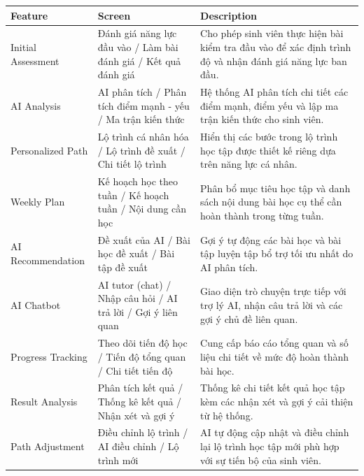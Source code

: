 \documentclass[12pt,a4paper]{article}
\begin{document}
	\begin{longtable}{|p{3.2cm}|p{5.5cm}|p{7.3cm}|}
		\hline
		\rowcolor{tableheader}
		\textbf{Feature} & \textbf{Screen} & \textbf{Description} \\ \hline
		\endhead
		
		Initial Assessment & Đánh giá năng lực đầu vào / Làm bài đánh giá / Kết quả đánh giá & Cho phép sinh viên thực hiện bài kiểm tra đầu vào để xác định trình độ và nhận đánh giá năng lực ban đầu. \\ \hline
		
		AI Analysis & AI phân tích / Phân tích điểm mạnh - yếu / Ma trận kiến thức & Hệ thống AI phân tích chi tiết các điểm mạnh, điểm yếu và lập ma trận kiến thức cho sinh viên. \\ \hline
		
		Personalized Path & Lộ trình cá nhân hóa / Lộ trình đề xuất / Chi tiết lộ trình & Hiển thị các bước trong lộ trình học tập được thiết kế riêng dựa trên năng lực cá nhân. \\ \hline
		
		Weekly Plan & Kế hoạch học theo tuần / Kế hoạch tuần / Nội dung cần học & Phân bổ mục tiêu học tập và danh sách nội dung bài học cụ thể cần hoàn thành trong từng tuần. \\ \hline
		
		AI Recommendation & Đề xuất của AI / Bài học đề xuất / Bài tập đề xuất & Gợi ý tự động các bài học và bài tập luyện tập bổ trợ tối ưu nhất do AI phân tích. \\ \hline
		
		AI Chatbot & AI tutor (chat) / Nhập câu hỏi / AI trả lời / Gợi ý liên quan & Giao diện trò chuyện trực tiếp với trợ lý AI, nhận câu trả lời và các gợi ý chủ đề liên quan. \\ \hline
		
		Progress Tracking & Theo dõi tiến độ học / Tiến độ tổng quan / Chi tiết tiến độ & Cung cấp báo cáo tổng quan và số liệu chi tiết về mức độ hoàn thành bài học. \\ \hline
		
		Result Analysis & Phân tích kết quả / Thống kê kết quả / Nhận xét và gợi ý & Thống kê chi tiết kết quả học tập kèm các nhận xét và gợi ý cải thiện từ hệ thống. \\ \hline
		
		Path Adjustment & Điều chỉnh lộ trình / AI điều chỉnh / Lộ trình mới & AI tự động cập nhật và điều chỉnh lại lộ trình học tập mới phù hợp với sự tiến bộ của sinh viên. \\ \hline
		
	\end{longtable}
	
	
\end{document}
